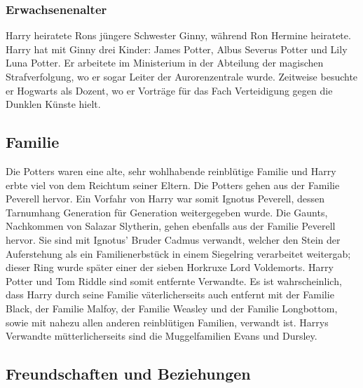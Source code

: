 \documentclass[a4paper, 10pt]{article}
\begin{document}
\subsubsection*{\large Erwachsenenalter}
Harry heiratete Rons jüngere Schwester Ginny, während Ron Hermine heiratete. Harry hat mit Ginny drei Kinder: James Potter, Albus Severus Potter und Lily Luna Potter. Er arbeitete im Ministerium in der Abteilung der magischen Strafverfolgung, wo er sogar Leiter der Aurorenzentrale wurde. Zeitweise besuchte er Hogwarts als Dozent, wo er Vorträge für das Fach Verteidigung gegen die Dunklen Künste hielt.
\subsection*{\Large Familie}
Die Potters waren eine alte, sehr wohlhabende reinblütige Familie und Harry erbte viel von dem Reichtum seiner Eltern. Die Potters gehen aus der Familie Peverell hervor. Ein Vorfahr von Harry war somit Ignotus Peverell, dessen Tarnumhang Generation für Generation weitergegeben wurde. Die Gaunts, Nachkommen von Salazar Slytherin, gehen ebenfalls aus der Familie Peverell hervor. Sie sind mit Ignotus' Bruder Cadmus verwandt, welcher den Stein der Auferstehung als ein Familienerbstück in einem Siegelring verarbeitet weitergab; dieser Ring wurde später einer der sieben Horkruxe Lord Voldemorts. Harry Potter und Tom Riddle sind somit entfernte Verwandte.
\vspace{10pt}
\newline
{}  
Es ist wahrscheinlich, dass Harry durch seine Familie väterlicherseits auch entfernt mit der Familie Black, der Familie Malfoy, der Familie Weasley und der Familie Longbottom, sowie mit nahezu allen anderen reinblütigen Familien, verwandt ist. Harrys Verwandte mütterlicherseits sind die Muggelfamilien Evans und Dursley.
\subsection*{\Large Freundschaften und Beziehungen}
\vspace{5pt}
\end{document}
